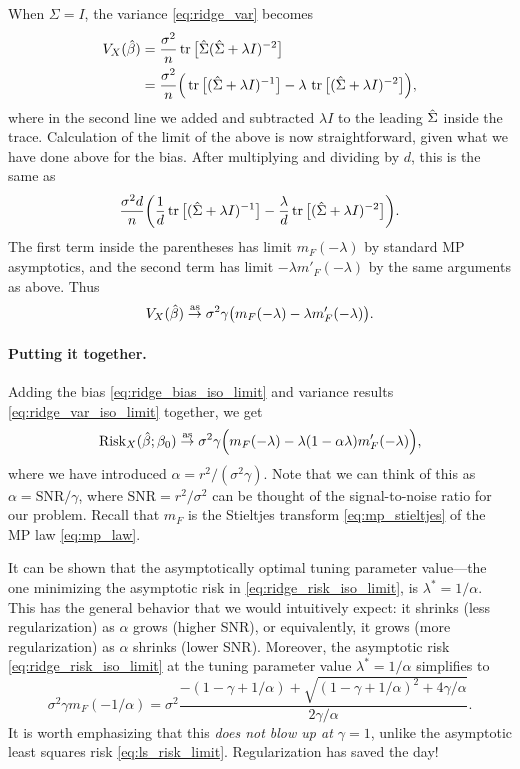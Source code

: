 \documentclass{article}
\begin{document}
When $\Sigma = I$, the variance \eqref{eq:ridge_var} becomes 
\begin{align*}
V_X(\hat{\beta})
&= \frac{\sigma^2}{n} \operatorname{tr} \big[ \hat\Sigma ( \hat\Sigma + \lambda I)^{-2} \big] \\ 
&=\frac{\sigma^2}{n} \Big( \operatorname{tr} \big[ ( \hat\Sigma + \lambda I)^{-1} \big] - 
\lambda \, \operatorname{tr} \big[ (\hat\Sigma + \lambda I)^{-2} \big] \Big),
\end{align*}
where in the second line we added and subtracted $\lambda I$ to the leading
$\hat\Sigma$ inside the trace. Calculation of the limit of the above is now
straightforward, given what we have done above for the bias. After multiplying 
and dividing by $d$, this is the same as 
\[
\frac{\sigma^2 d}{n} \bigg( \frac{1}{d} \operatorname{tr} \big[ ( \hat\Sigma + \lambda I)^{-1} 
\big] - \frac{\lambda}{d} \operatorname{tr} \big[ (\hat\Sigma + \lambda I)^{-2} \big] \bigg).  
\]
The first term inside the parentheses has limit $m_F(-\lambda)$ by standard MP
asymptotics, and the second term has limit $-\lambda m'_F(-\lambda)$ by the same
arguments as above. Thus   
\begin{equation}
\label{eq:ridge_var_iso_limit}
V_X(\hat{\beta}) \overset{\mathrm{as}}{\to} \sigma^2 \gamma \big( m_F(-\lambda) - \lambda 
m'_F(-\lambda) \big).
\end{equation}

\paragraph{Putting it together.}

Adding the bias \eqref{eq:ridge_bias_iso_limit} and variance results
\eqref{eq:ridge_var_iso_limit} together, we get
\begin{equation}
\label{eq:ridge_risk_iso_limit}
\mathrm{Risk}_X(\hat{\beta}; \beta_0) \overset{\mathrm{as}}{\to} \sigma^2 \gamma 
\Big( m_F(-\lambda) - \lambda (1 - \alpha \lambda) m'_F(-\lambda) \Big), 
\end{equation}
where we have introduced $\alpha = r^2 / (\sigma^2 \gamma)$. Note that we can
think of this as $\alpha = \mathrm{SNR} / \gamma$, where $\mathrm{SNR} = r^2 /
\sigma^2$ can be thought of the signal-to-noise ratio for our problem. Recall
that $m_F$ is the Stieltjes transform \eqref{eq:mp_stieltjes} of the MP law
\eqref{eq:mp_law}. 

It can be shown that the asymptotically optimal tuning parameter value---the one
minimizing the asymptotic risk in \eqref{eq:ridge_risk_iso_limit}, is $\lambda^*
= 1/\alpha$. This has the general behavior that we would intuitively expect: it
shrinks (less regularization) as $\alpha$ grows (higher SNR), or equivalently,
it grows (more regularization) as $\alpha$ shrinks (lower SNR). Moreover, the
asymptotic risk \eqref{eq:ridge_risk_iso_limit} at the tuning parameter value
$\lambda^* = 1/\alpha$ simplifies to      
\[
\sigma^2 \gamma m_F(-1/\alpha) = \sigma^2 \frac{-(1 - \gamma + 1/\alpha) + 
  \sqrt{(1 - \gamma + 1/\alpha)^2 + 4\gamma / \alpha}}{2\gamma /\alpha}.     
\]
It is worth emphasizing that this \emph{does not blow up at $\gamma = 1$}, 
unlike the asymptotic least squares risk \eqref{eq:ls_risk_limit}. 
Regularization has saved the day! 
\end{document}
